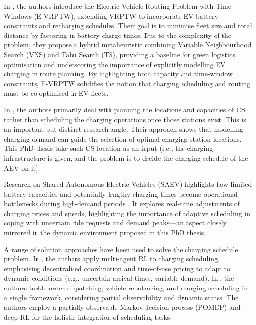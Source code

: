 In \cite{schneider2014electric}, the authors introduce the Electric Vehicle Routing Problem with Time Windows (E-VRPTW), extending VRPTW to incorporate EV battery constraints and recharging schedules. Their goal is to minimise fleet size and total distance by factoring in battery charge times. Due to the complexity of the problem, they propose a hybrid metaheuristic combining Variable Neighbourhood Search (VNS) and Tabu Search (TS), providing a baseline for green logistics optimisation and underscoring the importance of explicitly modelling EV charging in route planning. By highlighting both capacity and time-window constraints, E-VRPTW solidifies the notion that charging scheduling and routing must be co-optimised in EV fleets.

In \cite{luo2018optimal}, the authors primarily deal with planning the locations and capacities of CS rather than scheduling the charging operations once those stations exist. This is an important but distinct research angle. Their approach shows that modelling charging demand can guide the selection of optimal charging station locations. This PhD thesis take such CS location as an input (i.e., the charging infrastructure is given, and the problem is to decide the charging schedule of the AEV on it). 

Research on Shared Autonomous Electric Vehicles (SAEV) highlights how limited battery capacities and potentially lengthy charging times become operational bottlenecks during high-demand periods \cite{wang2021pricing}. It explores real-time adjustments of charging prices and speeds, highlighting the importance of adaptive scheduling in coping with uncertain ride requests and demand peaks—an aspect closely mirrored in the dynamic environment proposed in this PhD thesis.

A range of solution approaches have been used to solve the charging schedule problem. In  \cite{wu2022timeofuse,tan2022fleet}, the authors apply multi-agent RL to charging scheduling, emphasising decentralised coordination and time-of-use pricing to adapt to dynamic conditions (e.g., uncertain arrival times, variable demand). In \cite{liang2021mobility}, the authors tackle order dispatching, vehicle rebalancing, and charging scheduling in a single framework, considering partial observability and dynamic states. The authors employ a partially observable Markov decision process (POMDP) and deep RL for the holistic integration of scheduling tasks.

